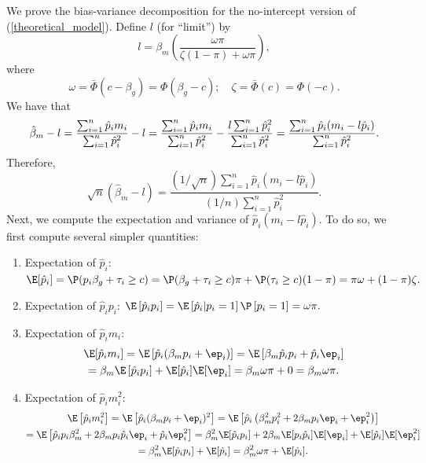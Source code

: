 \documentclass[11pt]{article}
\begin{document}
\begin{appendices}
\begin{refsection}
We prove the bias-variance decomposition for the no-intercept version of (\ref{theoretical_model}). Define $l$ (for ``limit'') by
$$l = \beta_m \left(\frac{\omega \pi}{\zeta(1-\pi) + \omega \pi}\right),$$ where
$$
\omega = \bar{\Phi}(c - \beta_g) = \Phi(\beta_g - c); \quad
\zeta = \bar{\Phi}(c) = \Phi(-c).
$$
We have that
\begin{equation*}
\hat{\beta}_m - l = \frac{\sum_{i=1}^n \hat{p}_i m_i}{ \sum_{i=1}^n \hat{p}^2_i} - l = \frac{\sum_{i=1}^n \hat{p}_i m_i}{ \sum_{i=1}^n \hat{p}^2_i} - \frac{l \sum_{i=1}^n \hat{p}_i^2 }{ \sum_{i=1}^n \hat{p}_i^2} \\ = \frac{\sum_{i=1}^n \hat{p}_i(m_i - l \hat{p}_i)}{ \sum_{i=1}^n \hat{p}_i^2}.
\end{equation*}
Therefore,
\begin{equation}\label{bc_decomp_1}
\sqrt{n}(\hat{\beta}_m - l) = \frac{(1/\sqrt{n})\sum_{i=1}^n \hat{p}_i(m_i - l \hat{p}_i)}{(1/n)\sum_{i=1}^n \hat{p}_i^2}.
\end{equation}
Next, we compute the expectation and variance of $\hat{p}_i(m_i - l\hat{p}_i)$. To do so, we first compute several simpler quantities:
\begin{enumerate}
\item Expectation of $\hat{p}_i$: $
\E[\hat{p}_i] = \P(p_i\beta_g + \tau_i \geq c) =  \P(\beta_g + \tau_i \geq c)\pi + \P(\tau_i \geq c)(1-\pi) = \pi \omega + (1-\pi)\zeta.$

\item Expectation of $\hat{p}_i p_i$: $\E\left[\hat{p}_i p_i\right] = \E\left[\hat{p}_i | p_i = 1 \right]\P\left[p_i = 1\right] = \omega \pi.$
\item Expectation of $\hat{p}_i m_i$:
\begin{multline*}
\E[\hat{p}_i m_i] = \E\left[\hat{p}_i(\beta_m p_i + \ep_i)\right] = \E\left[\beta_m \hat{p}_i p_i + \hat{p}_i \ep_i \right] \\ = \beta_m \E\left[ \hat{p}_i p_i \right] + \E[\hat{p}_i]\E[\ep_i] = \beta_m \omega \pi + 0 = \beta_m \omega \pi.
\end{multline*}
\item Expectation of $\hat{p}_i m_i^2$: \begin{multline*}
\E\left[\hat{p}_i m_i^2\right] = \E \left[ \hat{p}_i( \beta_m p_i + \ep_i )^2 \right] = \E\left[ \hat{p}_i \left( \beta_m^2 p_i^2 + 2 \beta_m p_i \ep_i + \ep_i^2 \right)  \right] \\ = \E\left[ \hat{p}_i p_i \beta^2_m + 2 \beta_m p_i \hat{p}_i \ep_i + \hat{p}_i \ep_i^2 \right] = \beta^2_m \E[ \hat{p}_i p_i] + 2 \beta_m \E[p_i\hat{p}_i] \E[\ep_i] + \E[\hat{p}_i] \E[ \ep^2_i ] \\ = \beta^2_m \E[ \hat{p}_i p_i] + \E[\hat{p}_i] = \beta^2_m \omega \pi + \E[ \hat{p}_i]. 
\end{multline*}
\end{enumerate}


\end{refsection}
\end{appendices}
\end{document}
